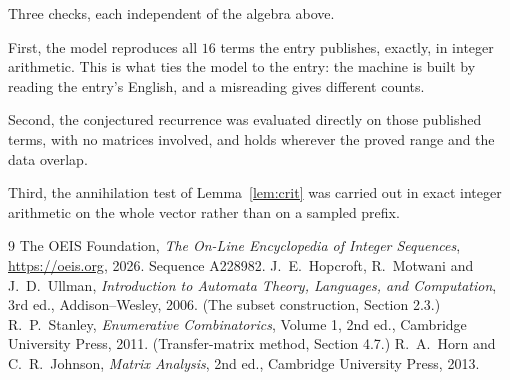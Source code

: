 \documentclass[11pt,a4paper]{article}
\theoremstyle{plain}
\theoremstyle{definition}
\begin{document}
Three checks, each independent of the algebra above.

First, the model reproduces all $16$ terms the entry publishes, exactly, in integer
arithmetic. This is what ties the model to the entry: the machine is built by reading the
entry's English, and a misreading gives different counts.

Second, the conjectured recurrence was evaluated directly on those published terms, with no
matrices involved, and holds wherever the proved range and the data overlap.

Third, the annihilation test of Lemma~\ref{lem:crit} was carried out in exact integer
arithmetic on the whole vector rather than on a sampled prefix.

\begin{thebibliography}{9}
 The OEIS Foundation, \emph{The On-Line Encyclopedia of Integer
Sequences}, \url{https://oeis.org}, 2026. Sequence A228982.
 J.~E.~Hopcroft, R.~Motwani and J.~D.~Ullman, \emph{Introduction to Automata
Theory, Languages, and Computation}, 3rd ed., Addison--Wesley, 2006. (The subset
construction, Section 2.3.)
 R.~P.~Stanley, \emph{Enumerative Combinatorics}, Volume 1, 2nd ed.,
Cambridge University Press, 2011. (Transfer-matrix method, Section 4.7.)
 R.~A.~Horn and C.~R.~Johnson, \emph{Matrix Analysis}, 2nd ed., Cambridge
University Press, 2013.
\end{thebibliography}
\end{document}
